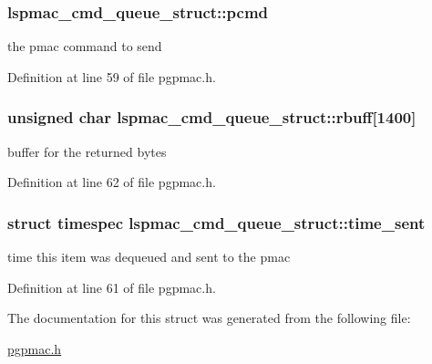 \hypertarget{structlspmac__cmd__queue__struct_a9ac7618bbe0faa3001e8efeb1d89010d}{
\subsubsection[{pcmd}]{ lspmac\-\_\-cmd\-\_\-queue\-\_\-struct\-::pcmd}}\label{structlspmac__cmd__queue__struct_a9ac7618bbe0faa3001e8efeb1d89010d}


the pmac command to send 



Definition at line 59 of file pgpmac.\-h.

\hypertarget{structlspmac__cmd__queue__struct_aa059563886db174f9bb4f7a14bc19bbe}{
\subsubsection[{rbuff}]{\setlength{\rightskip}{0pt plus 5cm}unsigned char lspmac\-\_\-cmd\-\_\-queue\-\_\-struct\-::rbuff\mbox{[}1400\mbox{]}}}\label{structlspmac__cmd__queue__struct_aa059563886db174f9bb4f7a14bc19bbe}


buffer for the returned bytes 



Definition at line 62 of file pgpmac.\-h.

\hypertarget{structlspmac__cmd__queue__struct_a276ebc4b35c2554e4cb7377b60fd89b7}{
\subsubsection[{time\-\_\-sent}]{\setlength{\rightskip}{0pt plus 5cm}struct timespec lspmac\-\_\-cmd\-\_\-queue\-\_\-struct\-::time\-\_\-sent}}\label{structlspmac__cmd__queue__struct_a276ebc4b35c2554e4cb7377b60fd89b7}


time this item was dequeued and sent to the pmac 



Definition at line 61 of file pgpmac.\-h.



The documentation for this struct was generated from the following file\-:\begin{DoxyCompactItemize}
\item 
\hyperlink{pgpmac_8h}{pgpmac.\-h}\end{DoxyCompactItemize}
